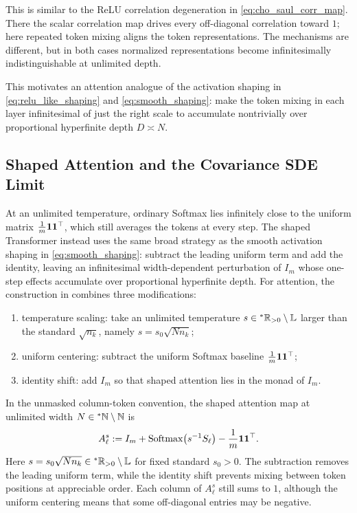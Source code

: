 This is similar to the ReLU correlation degeneration in \eqref{eq:cho_saul_corr_map}.
There the scalar correlation map drives every off-diagonal correlation toward $1$; here repeated token mixing aligns the token representations. The mechanisms are different, but in both cases normalized representations become infinitesimally indistinguishable at unlimited depth.

This motivates an attention analogue of the activation shaping in \eqref{eq:relu_like_shaping} and \eqref{eq:smooth_shaping}:
make the token mixing in each layer infinitesimal of just the right scale to accumulate nontrivially over proportional hyperfinite depth $D \asymp N$.

\subsection{Shaped Attention and the Covariance SDE Limit}
\label{subsec:shaped-attn-sde}

At an unlimited temperature, ordinary Softmax lies infinitely close to the uniform matrix $\frac{1}{m}\mathbf{1}\mathbf{1}^\top$, which still averages the tokens at every step. The shaped Transformer instead uses the same broad strategy as the smooth activation shaping in \eqref{eq:smooth_shaping}:
subtract the leading uniform term and add the identity, leaving an infinitesimal width-dependent perturbation of $I_m$ whose one-step effects accumulate over proportional hyperfinite depth. For attention, the construction in \cite[Section 4.2]{noci2023shaped} combines three modifications:
\begin{enumerate}[label=(\alph*)]
  \item temperature scaling: take an unlimited temperature $s \in {}^*\mathbb{R}_{>0} \setminus \mathbb{L}$ larger than the standard $\sqrt{n_k}$, namely $s = s_0 \sqrt{N n_k}$;
  \item uniform centering: subtract the uniform Softmax baseline $\frac{1}{m}\mathbf{1}\mathbf{1}^\top$;
  \item identity shift: add $I_m$ so that shaped attention lies in the monad of $I_m$.
\end{enumerate}

\begin{definition}
\label{def:shaped-attention}
In the unmasked column-token convention, the shaped attention map at unlimited width $N \in {}^*\mathbb{N} \setminus \mathbb{N}$ is
\begin{equation}
\label{eq:ch6-shaped-attn-def}
A_\ell^s := I_m + \operatorname{Softmax}\bigl(s^{-1} S_\ell\bigr) - \frac{1}{m}\mathbf{1}\mathbf{1}^\top.
\end{equation}
Here $s = s_0 \sqrt{N n_k} \in {}^*\mathbb{R}_{>0} \setminus \mathbb{L}$ for fixed standard $s_0 > 0$. The subtraction removes the leading uniform term, while the identity shift prevents mixing between token positions at appreciable order. Each column of $A_\ell^s$ still sums to $1$, although the uniform centering means that some off-diagonal entries may be negative.
\end{definition}

